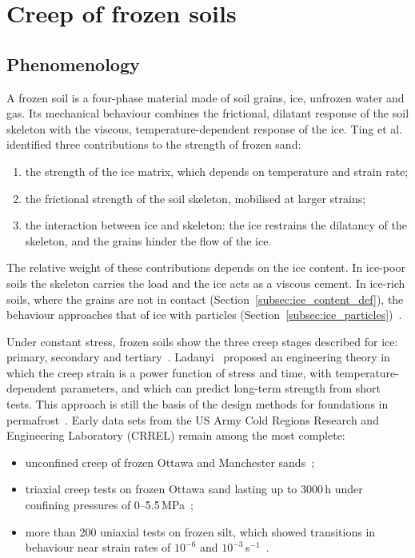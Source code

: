 \section{Creep of frozen soils}
\label{sec:frozen_soils}

\subsection{Phenomenology}

A frozen soil is a four-phase material made of soil grains, ice, unfrozen water and gas. Its mechanical behaviour combines the frictional, dilatant response of the soil skeleton with the viscous, temperature-dependent response of the ice. Ting et al.~\cite{ting1983} identified three contributions to the strength of frozen sand:
\begin{enumerate}
    \item the strength of the ice matrix, which depends on temperature and strain rate;
    \item the frictional strength of the soil skeleton, mobilised at larger strains;
    \item the interaction between ice and skeleton: the ice restrains the dilatancy of the skeleton, and the grains hinder the flow of the ice.
\end{enumerate}
The relative weight of these contributions depends on the ice content. In ice-poor soils the skeleton carries the load and the ice acts as a viscous cement. In ice-rich soils, where the grains are not in contact (Section~\ref{subsec:ice_content_def}), the behaviour approaches that of ice with particles (Section~\ref{subsec:ice_particles})~\cite{arenson2007}.

Under constant stress, frozen soils show the three creep stages described for ice: primary, secondary and tertiary~\cite{andersland2004}. Ladanyi~\cite{ladanyi1972} proposed an engineering theory in which the creep strain is a power function of stress and time, with temperature-dependent parameters, and which can predict long-term strength from short tests. This approach is still the basis of the design methods for foundations in permafrost~\cite{andersland2004}. Early data sets from the US Army Cold Regions Research and Engineering Laboratory (CRREL) remain among the most complete:
\begin{itemize}
    \item unconfined creep of frozen Ottawa and Manchester sands~\cite{sayles1968};
    \item triaxial creep tests on frozen Ottawa sand lasting up to 3000\,h under confining pressures of 0--5.5\,MPa~\cite{sayles1974};
    \item more than 200 uniaxial tests on frozen silt, which showed transitions in behaviour near strain rates of $10^{-6}$ and $10^{-3}$\,s$^{-1}$~\cite{zhu1987}.
\end{itemize}

